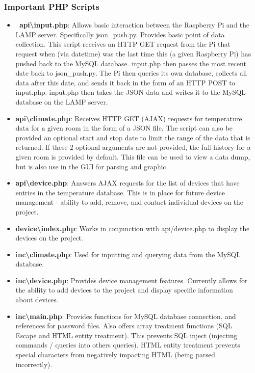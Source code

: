 \documentclass{article}
\begin{document}
			\subsubsection{Important PHP Scripts}		
				\begin{itemize}
					\item {\bfseries\ api\textbackslash input.php}: Allows basic interaction between the Raspberry Pi and the LAMP server. Specifically json\_push.py.
														Provides basic point of data collection. This script receives an HTTP GET request from the Pi that 
														request when (via datetime)
														was the last time this (a given Raspberry Pi) has pushed back to the MySQL database. input.php then  
														passes the most recent date back to json\_push.py. The Pi then queries its own database, collects all 
														data after this date, and sends it back in the form of an HTTP POST to input.php. input.php then takes 
														the JSON data and writes it to the MySQL database on the LAMP server.
										  
					\item {\bfseries api\textbackslash climate.php}: Receives HTTP GET (AJAX) requests for temperature data for a given room in the form of a 	 																	 JSON file. 
														 The script can also be provided an optional start and stop date to limit the range of the data that 
														 is returned. If these 2 optional arguments are not provided, the full history for a given room is 
														 provided by default. This file can be used to view a data dump, but is also use in the GUI for 
														 parsing and graphic.
					\item {\bfseries api\textbackslash device.php}: Answers AJAX requests for the list of devices that have entries in the temperature 			 																	database. This is
										 		        in place for future device management - ability to add, remove, and contact individual devices on the 
										 		        project.
					\item {\bfseries device\textbackslash index.php}: Works in conjunction with api/device.php to display the devices on the project.	
					
					\item {\bfseries inc\textbackslash climate.php}: Used for inputting and querying data from the MySQL database.  	
					
					\item {\bfseries inc\textbackslash device.php}: Provides device management features. Currently allows for the ability to add devices to 	 																	the project
														and display specific information about devices.
					
					\item {\bfseries inc\textbackslash main.php}: Provides functions for MySQL database connection, and references for password files. 
													  Also offers array treatment functions (SQL Escape and HTML entity treatment). This prevents
													  SQL inject (injecting commands / queries into others queries). HTML entity treatment prevents special 
													  characters from negatively impacting HTML (being parsed incorrectly).	
				\end{itemize}						
\end{document}
